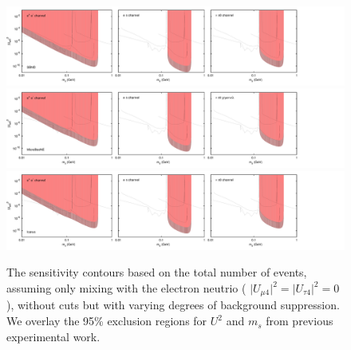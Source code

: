 \documentclass[11pt, a4paper]{article}
\begin{document}
\begin{figure}[t]
\center
\includegraphics[width=1.0\textwidth,clip,trim=0 20 300 15]{figures/sbnd_all_panels_ue4.pdf}
\includegraphics[width=1.0\textwidth,clip,trim=0 20 300 15]{figures/muboone_all_panels_ue4.pdf}
\includegraphics[width=1.0\textwidth,clip,trim=0 20 300 15]{figures/icarus_all_panels_ue4.pdf}

\caption{\label{fig:no_cuts_scaled_bkg_ue4_only}The sensitivity contours based on the total
	number of events, assuming only mixing with the electron neutrio ( $\vert U_{\mu 4}\vert^2=\vert U_{\tau 4}\vert^2=0$), without cuts but with varying degrees of background
suppression. We overlay the 95\% exclusion regions for $U^2$ and $m_s$ from
previous experimental work.}

\end{figure}
\end{document}
